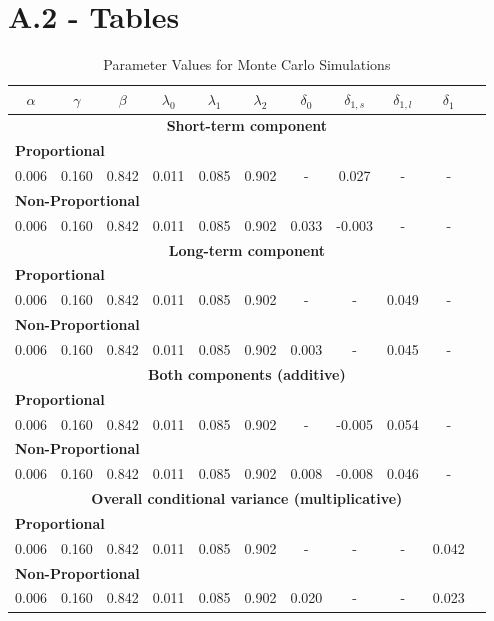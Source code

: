 \documentclass[12pt]{article}
\begin{document}
\section*{A.2 - Tables}
\begin{table}[!ht]
\centering
\caption{Parameter Values for Monte Carlo Simulations}
\begin{tabular}{ccccccccccc}
\midrule
\midrule
$\alpha$ & $\gamma$ & $\beta$ & $\lambda_0$ & $\lambda_1$ & $\lambda_2$ & $\delta_0$ & $\delta_{1,s}$ & $\delta_{1,l}$ & $\delta_{1}$\\
\midrule
\multicolumn{11}{c}{\textbf{Short-term component}}\\
\multicolumn{11}{l}{\textbf{Proportional}}\\
0.006 & 0.160 & 0.842 & 0.011 & 0.085 & 0.902 & - & 0.027 & - & -\\
\multicolumn{11}{l}{\textbf{Non-Proportional}}\\
0.006 & 0.160 & 0.842 & 0.011 & 0.085 & 0.902 & 0.033 & -0.003 & - & -\\
\midrule
\multicolumn{11}{c}{\textbf{Long-term component}}\\
\multicolumn{11}{l}{\textbf{Proportional}}\\
0.006 & 0.160 & 0.842 & 0.011 & 0.085 & 0.902 & - & - & 0.049  & -\\
\multicolumn{11}{l}{\textbf{Non-Proportional}}\\
0.006 & 0.160 & 0.842 & 0.011 & 0.085 & 0.902 & 0.003 & - & 0.045 & -\\
\midrule
\multicolumn{11}{c}{\textbf{Both components (additive)}}\\
\multicolumn{11}{l}{\textbf{Proportional}}\\
0.006 & 0.160 & 0.842 & 0.011 & 0.085 & 0.902 & - & -0.005 & 0.054 & -\\
\multicolumn{11}{l}{\textbf{Non-Proportional}}\\
0.006 & 0.160 & 0.842 & 0.011 & 0.085 & 0.902 & 0.008 & -0.008 & 0.046 & -\\
\midrule
\multicolumn{11}{c}{\textbf{Overall conditional variance (multiplicative)}}\\
\multicolumn{11}{l}{\textbf{Proportional}}\\
0.006 & 0.160 & 0.842 & 0.011 & 0.085 & 0.902 & - & - & - & 0.042\\
\multicolumn{11}{l}{\textbf{Non-Proportional}}\\
0.006 & 0.160 & 0.842 & 0.011 & 0.085 & 0.902 & 0.020 & - & - & 0.023\\
\midrule

\end{tabular}
\end{table}
\end{document}
